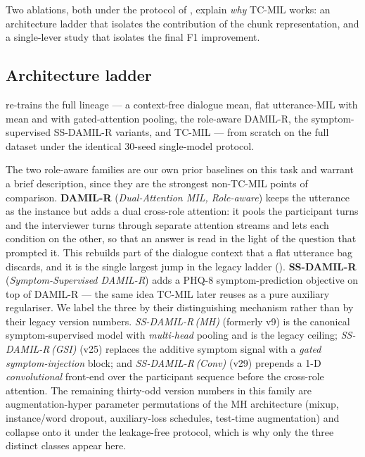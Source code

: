 \documentclass[conference]{IEEEtran}
\begin{document}
Two ablations, both under the protocol of , explain
\emph{why} TC-MIL works: an architecture ladder that isolates the contribution
of the chunk representation, and a single-lever study that isolates the final
F1 improvement.

\subsection{Architecture ladder}
 re-trains the full lineage --- a context-free dialogue
mean, flat utterance-MIL with mean and with gated-attention pooling, the
role-aware DAMIL-R, the symptom-supervised SS-DAMIL-R variants, and TC-MIL ---
from scratch on the full dataset under the identical 30-seed single-model
protocol.

The two role-aware families are our own prior baselines on this task and
warrant a brief description, since they are the strongest non-TC-MIL points of
comparison. \textbf{DAMIL-R} (\emph{Dual-Attention MIL, Role-aware}) keeps the
utterance as the instance but adds a dual cross-role attention: it pools the
participant turns and the interviewer turns through separate attention streams
and lets each condition on the other, so that an answer is read in the light of
the question that prompted it. This rebuilds part of the dialogue context that
a flat utterance bag discards, and it is the single largest jump in the legacy
ladder (). \textbf{SS-DAMIL-R} (\emph{Symptom-Supervised
DAMIL-R}) adds a PHQ-8 symptom-prediction objective on top of DAMIL-R --- the
same idea TC-MIL later reuses as a pure auxiliary regulariser. We label the three by their distinguishing
mechanism rather than by their legacy version numbers. \emph{SS-DAMIL-R\,(MH)}
(formerly v9) is the canonical symptom-supervised model with \emph{multi-head}
pooling and is the legacy ceiling; \emph{SS-DAMIL-R\,(GSI)} (v25) replaces the
additive symptom signal with a \emph{gated symptom-injection} block; and
\emph{SS-DAMIL-R\,(Conv)} (v29) prepends a 1-D \emph{convolutional} front-end
over the participant sequence before the cross-role attention. The
remaining thirty-odd version numbers in this family are augmentation-hyper\-
parameter permutations of the MH architecture (mixup, instance/word dropout,
auxiliary-loss schedules, test-time augmentation) and collapse onto it under
the leakage-free protocol, which is why only the three distinct classes appear
here.
\end{document}
